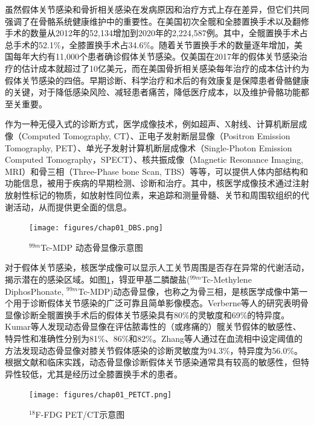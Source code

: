 虽然假体关节感染和骨折相关感染在发病原因和治疗方式上存在差异，但它们共同强调了在骨骼系统健康维护中的重要性。在美国初次全髋和全膝置换手术以及翻修手术的数量从2012年的52,134增加到2020年的2,224,587例。其中，全髋置换手术占总手术的52.1\%，全膝置换手术占34.6\%\cite{AJRR2021}。随着关节置换手术的数量逐年增加，美国每年大约有11,000个患者确诊假体关节感染\cite{kamath2015quantifying}。仅美国在2017年的假体关节感染治疗的估计成本就超过了10亿美元\cite{premkumar2021projected}，而在美国骨折相关感染每年治疗的成本估计约为假体关节感染的四倍\cite{thakore2015surgical}。早期诊断、科学治疗和术后的有效康复是保障患者骨骼健康的关键，对于降低感染风险、减轻患者痛苦，降低医疗成本，以及维护骨骼功能都至关重要。

作为一种无侵入式的诊断方式，医学成像技术，例如超声、X射线、计算机断层成像（Computed Tomography, CT）、正电子发射断层显像（Positron Emission Tomography, PET）、单光子发射计算机断层成像术（Single-Photon Emission Computed Tomography，SPECT）、核共振成像（Magnetic Resonance Imaging, MRI）和骨三相（Three-Phase bone Scan, TBS）等等，可以提供人体内部结构和功能信息，被用于疾病的早期检测、诊断和治疗。其中，核医学成像技术通过注射放射性标记的物质，如放射性同位素，来追踪和测量骨髓、关节和周围软组织的代谢活动，从而提供更全面的信息。

\begin{figure}[ht]
  \centering
  \texttt{[image: figures/chap01\_DBS.png]}
  \caption{\(^{99m}\)Tc-MDP 动态骨显像示意图}
  \label{fig:chap01_DBS}
\end{figure}

对于假体关节感染，核医学成像可以显示人工关节周围是否存在异常的代谢活动，揭示潜在的感染区域。如图\ref{fig:chap01_DBS}，锝亚甲基二膦酸盐(\(^{99m}\)Tc-Methylene DiphosPhonate, \(^{99m}\)Tc-MDP)动态骨显像，也称之为骨三相，是核医学成像中第一个用于诊断假体关节感染的广泛可靠且简单影像模态\cite{niccoli2017bone}。Verberne等人\cite{verberne2016accuracy}的研究表明骨显像诊断全髋置换手术后的假体关节感染具有80\%的灵敏度和69\%的特异度。Kumar等人\cite{kumar2016comparative}发现动态骨显像在评估脓毒性的（或疼痛的）髋关节假体的敏感性、特异性和准确性分别为81\%、86\%和82\%。Zhang等人\cite{zhang2022temporal}通过在血流相中设定阈值的方法发现动态骨显像对膝关节假体感染的诊断灵敏度为94.3\%，特异度为56.0\%。根据文献和临床实践，动态骨显像诊断假体关节感染通常具有较高的敏感性，但特异性较低，尤其是经历过全膝置换手术的患者。

\begin{figure}[ht]
  \centering
  \texttt{[image: figures/chap01\_PETCT.png]}
  \caption{\(^{18}\)F-FDG PET/CT示意图}
  \label{fig:chap01_PETCT}
\end{figure}

